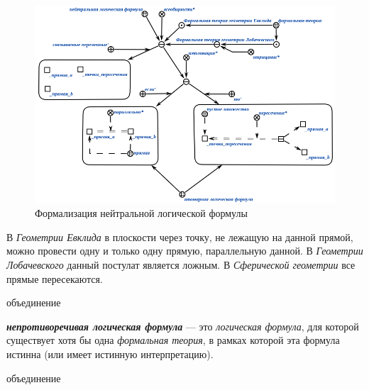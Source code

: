 \begin{figure}[H]
	\includegraphics[scale=0.8]{author/part2/figures/logic/neutral_formula.png}
	\caption{Формализация нейтральной логической формулы}
	\label{fig:neutral_formula}
\end{figure}

В \textit{Геометрии Евклида} в плоскости через точку, не лежащую на данной прямой, можно провести одну и только одну прямую, параллельную данной. В \textit{Геометрии Лобачевского} данный постулат является ложным.
В \textit{Сферической геометрии} все прямые пересекаются.

\begin{SCn}
\begin{scnreltoset}{объединение}
\end{scnreltoset}
\end{SCn}

\textbf{\textit{непротиворечивая логическая формула}} --- это \textit{логическая формула}, для которой существует хотя бы одна \textit{формальная теория}, в рамках которой эта формула истинна (или имеет истинную интерпретацию).

\begin{SCn}
\begin{scnreltoset}{объединение}
\end{scnreltoset}
\end{SCn}

